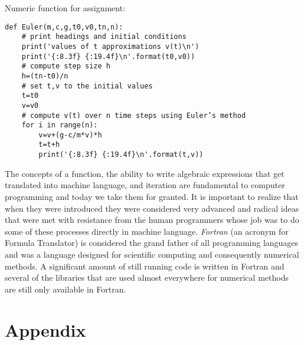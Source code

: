 \documentclass [titlepage,12pt,letter] {article}
\begin{document}
Numeric function for assignment:
\begin{verbatim}
def Euler(m,c,g,t0,v0,tn,n):
    # print headings and initial conditions
    print('values of t approximations v(t)\n')
    print('{:8.3f} {:19.4f}\n'.format(t0,v0))
    # compute step size h
    h=(tn-t0)/n
    # set t,v to the initial values
    t=t0
    v=v0
    # compute v(t) over n time steps using Euler’s method
    for i in range(n):
        v=v+(g-c/m*v)*h
        t=t+h
        print('{:8.3f} {:19.4f}\n'.format(t,v))
\end{verbatim}


The concepts of a function, the ability to write algebraic expressions
that get translated into machine language, and iteration are
fundamental to computer programming and today we take them for
granted. It is important to realize that when they were introduced
they were considered very advanced and radical ideas that were met
with resistance from the human programmers whose job was to do some of
these processes directly in machine language. {\it Fortran} (an
acronym for Formula Translator) is considered the grand father of all
programming languages and was a language designed for scientific
computing and consequently numerical methods. A significant amount of still running code is
written in Fortran and several of the libraries that are used almost
everywhere for numerical methods are still only available in Fortran.

\section*{Appendix} 
\end{document}
